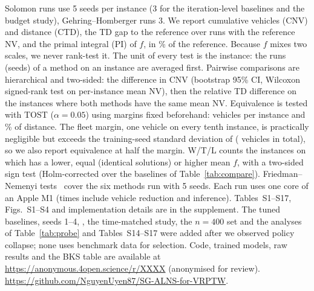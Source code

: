 {\widetables

}
Solomon runs use 5 seeds per instance (3 for the iteration-level baselines and the
budget study), Gehring--Homberger runs 3. We report cumulative vehicles (CNV) and
distance (CTD), the TD gap to the reference over runs with the reference NV, and the
primal integral (PI) of $f$, in \% of the reference.
Because $f$ mixes two scales, we never rank-test it. The unit of every test is
the instance: the runs (seeds) of a method on an instance are averaged first. Pairwise
comparisons are hierarchical and two-sided: the difference in CNV (bootstrap 95\% CI, Wilcoxon
signed-rank test on per-instance mean NV), then the relative TD difference on the
instances where both methods have the same mean NV. Equivalence is tested with TOST
($\alpha=0.05$) using margins fixed beforehand: \rdeltaNV{} vehicles per instance and
\rdeltaTD{}\% of distance. The fleet margin, one vehicle on every tenth instance, is
practically negligible but exceeds the training-seed standard deviation of \sgalns{}
(\qSeedSd{} vehicles in total), so we also report equivalence at half the margin. W/T/L counts the instances on which \sgalns{} has a lower,
equal (identical solutions) or higher mean $f$, with a two-sided sign test
(Holm-corrected over the baselines of Table~\ref{tab:compare}).
Friedman--Nemenyi tests~\cite{demsar2006} cover the six methods run with 5 seeds. Each run uses one core of an Apple M1 (times include vehicle reduction and inference).
Tables~S1--S17, Figs.~S1--S4 and implementation details are in the supplement. The
tuned baselines, seeds 1--4, \sgc{}, the time-matched study, the $n=400$ set and the
analyses of Table~\ref{tab:probe} and Tables~S14--S17 were added after we observed policy collapse; none uses benchmark data for selection. Code,
trained models, raw results and the BKS table are available at
\ifanonymous\url{https://anonymous.4open.science/r/XXXX} (anonymised for review).%
\else\url{https://github.com/NguyenUyen87/SG-ALNS-for-VRPTW}.\fi
